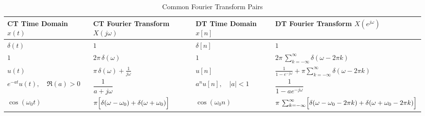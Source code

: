\documentclass[8pt]{article}
\begin{document}
\begin{multicols}{2}
    \begin{table*}[ht]
        \centering
        \caption{Common Fourier Transform Pairs}
        \label{tab:common_fourier_transforms}
        \small
        \begin{tabular}{@{}llll@{}}
            \toprule
            \textbf{CT Time Domain} $x(t)$                                 & \textbf{CT Fourier Transform} $X(j\omega)$                                    & \textbf{DT Time Domain} $x[n]$                                          & \textbf{DT Fourier Transform} $X(e^{j\omega})$                                                                         \\
            \midrule
            $\delta(t)$                                                    & $1$                                                                           & $\delta[n]$                                                             & $1$                                                                                                                    \\ [1mm]
            $1$                                                            & $2\pi\,\delta(\omega)$                                                        & $1$                                                                     & $2\pi\,\sum_{k=-\infty}^{\infty}\delta(\omega-2\pi k)$                                                                 \\ [1mm]
            $u(t)$                                                         & $\pi\,\delta(\omega) + \frac{1}{j\omega}$                                     & $u[n]$                                                                  & $\frac{1}{1-e^{-j\omega}} + \pi \sum_{k=-\infty}^{\infty} \delta(\omega - 2\pi k)$                                     \\ [1mm] %
            $e^{-at}u(t),\quad \Re(a)>0$                                   & $\dfrac{1}{a+j\omega}$                                                        & $a^n u[n],\quad |a|<1$                                                  & $\dfrac{1}{1-ae^{-j\omega}}$                                                                                           \\ [1mm]
            $\cos(\omega_0 t)$                                             & $\pi\Bigl[\delta(\omega-\omega_0) + \delta(\omega+\omega_0)\Bigr]$            & $\cos(\omega_0 n)$                                                      & $\pi\,\sum_{k=-\infty}^{\infty}\Bigl[\delta(\omega-\omega_0-2\pi k) + \delta(\omega+\omega_0-2\pi k)\Bigr]$            \\ [1mm]

\end{tabular}
\end{table*}
\end{multicols}
\end{document}
